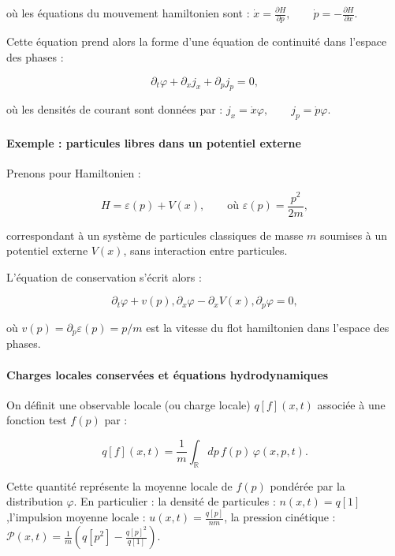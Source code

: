 où les équations du mouvement hamiltonien sont :
\(
\dot{x} = \frac{\partial H}{\partial p}, \qquad \dot{p} = -\frac{\partial H}{\partial x}.
\)

Cette équation prend alors la forme d’une équation de continuité dans l’espace des phases :

\begin{equation}
\partial_t \varphi + \partial_x j_x + \partial_p j_p = 0,
\end{equation}

où les densités de courant sont données par :
\(
j_x = \dot{x} \varphi, \qquad j_p = \dot{p} \varphi.
\)

\paragraph{Exemple : particules libres dans un potentiel externe}
Prenons pour Hamiltonien :

\begin{equation}
H = \varepsilon(p) + V(x), \qquad \text{où } \varepsilon(p) = \frac{p^2}{2m},
\end{equation}

correspondant à un système de particules classiques de masse $m$ soumises à un potentiel externe $V(x)$, sans interaction entre particules.

L'équation de conservation s’écrit alors :

\begin{equation}
\partial_t \varphi + v(p) , \partial_x \varphi - \partial_x V(x) , \partial_p \varphi = 0,
\end{equation}

où $v(p) = \partial_p \varepsilon(p) = p/m$ est la vitesse du flot hamiltonien dans l’espace des phases.

\paragraph{Charges locales conservées et équations hydrodynamiques}
On définit une observable locale (ou charge locale) $q[f](x, t)$ associée à une fonction test $f(p)$ par :

\begin{equation}
q[f](x, t) = \frac{1}{m} \int_{\mathbb{R}} dp \, f(p) \, \varphi(x, p, t).
\end{equation}

Cette quantité représente la moyenne locale de $f(p)$ pondérée par la distribution $\varphi$. En particulier : la densité de particules : $n(x, t) = q[1]$,l’impulsion moyenne locale : $u(x, t) = \frac{q[p]}{n m}$, la pression cinétique : $\mathcal{P}(x, t) = \frac{1}{m} \left( q[p^2] - \frac{q[p]^2}{q[1]} \right)$.

